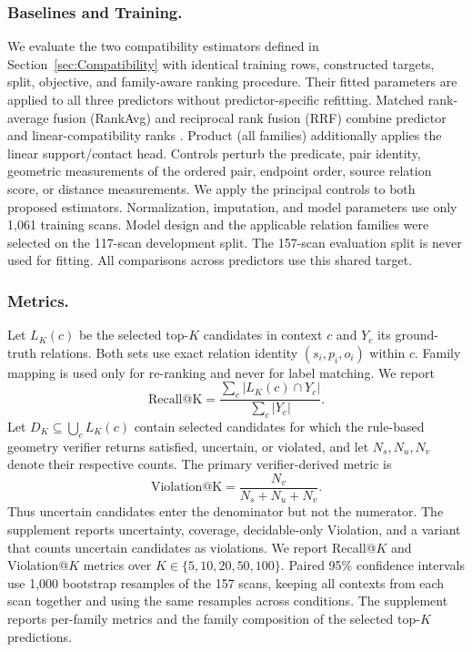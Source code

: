 \subsubsection{Baselines and Training.}
We evaluate the two compatibility estimators defined in Section~\ref{sec:Compatibility} with identical training rows, constructed targets, split, objective, and family-aware ranking procedure. Their fitted parameters are applied to all three predictors without predictor-specific refitting. Matched rank-average fusion (RankAvg) and reciprocal rank fusion (RRF) combine predictor and linear-compatibility ranks \cite{10.1145/1571941.1572114}. Product (all families) additionally applies the linear support/contact head. Controls perturb the predicate, pair identity, geometric measurements of the ordered pair, endpoint order, source relation score, or distance measurements. We apply the principal controls to both proposed estimators.
Normalization, imputation, and model parameters use only 1,061 training scans. Model design and the applicable relation families were selected on the 117-scan development split. The 157-scan evaluation split is never used for fitting. All comparisons across predictors use this shared target.

\subsubsection{Metrics.}
Let $L_K(c)$ be the selected top-$K$ candidates in context $c$ and $Y_c$ its ground-truth relations. Both sets use exact relation identity $(s_i,p_i,o_i)$ within $c$. Family mapping is used only for re-ranking and never for label matching. We report
\begin{equation}
\mathrm{Recall@K}=\frac{\sum_c |L_K(c)\cap Y_c|}{\sum_c |Y_c|}.
\end{equation}
Let $D_K\subseteq\bigcup_c L_K(c)$ contain selected candidates for which the rule-based geometry verifier returns satisfied, uncertain, or violated, and let $N_s,N_u,N_v$ denote their respective counts. The primary verifier-derived metric is
\begin{equation}
\mathrm{Violation@K}=\frac{N_v}{N_s+N_u+N_v}.
\end{equation}
Thus uncertain candidates enter the denominator but not the numerator. 
The supplement reports uncertainty, coverage, decidable-only Violation, and a variant that counts uncertain candidates as violations.
We report Recall@$K$ and Violation@$K$ metrics over $K \in \{5, 10, 20, 50, 100\}$. Paired 95\% confidence intervals use 1,000 bootstrap resamples of the 157 scans, keeping all contexts from each scan together and using the same resamples across conditions. The supplement reports per-family metrics and the family composition of the selected top-$K$ predictions.

